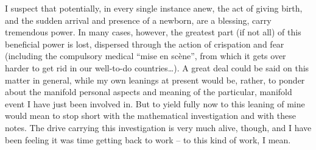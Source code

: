 I suspect that potentially, in every single instance anew, the act of
giving birth, and the sudden arrival and presence of a newborn, are a
blessing, carry tremendous power. In many cases, however, the greatest
part (if not all) of this beneficial power is lost, dispersed through
the action of crispation and fear (including the compulsory medical
``mise en scène'', from which it gets over harder to get rid in our
well-to-do countries\dots). A great deal could be said on this matter
in general, while my own leanings at present would be, rather, to
ponder about the manifold personal aspects and meaning of the
particular, manifold event I have just been involved in. But to yield
fully now to this leaning of mine would mean to stop short with the
mathematical investigation and with these notes. The drive carrying
this investigation is very much alive, though, and I have been feeling
it was time getting back to work -- to this kind of work, I mean.


